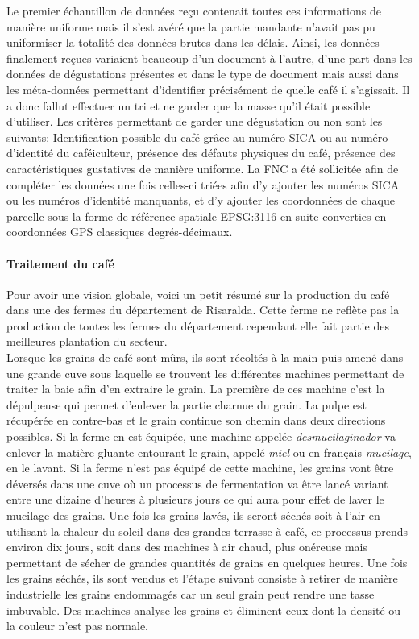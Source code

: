 \noindent Le premier échantillon de données reçu contenait toutes ces informations de manière uniforme mais il s'est avéré que la partie mandante n'avait pas pu uniformiser la totalité des données brutes dans les délais. Ainsi, les données finalement reçues variaient beaucoup d'un document à l'autre, d'une part dans les données de dégustations présentes et dans le type de document mais aussi dans les méta-données permettant d'identifier précisément de quelle café il s'agissait. Il a donc fallut effectuer un tri et ne garder que la masse qu'il était possible d'utiliser. Les critères permettant de garder une dégustation ou non sont les suivants: Identification possible du café grâce au numéro SICA ou au numéro d'identité du caféiculteur, présence des défauts physiques du café, présence des caractéristiques gustatives de manière uniforme. La FNC a été sollicitée afin de compléter les données une fois celles-ci triées afin d'y ajouter les numéros SICA ou les numéros d'identité manquants, et d'y ajouter les coordonnées de chaque parcelle sous la forme de référence spatiale EPSG:3116 en suite converties en coordonnées GPS classiques degrés-décimaux.\\

\paragraph{Traitement du café} Pour avoir une vision globale, voici un petit résumé sur la production du café dans une des fermes du département de Risaralda. Cette ferme ne reflète pas la production de toutes les fermes du département cependant elle fait partie des meilleures plantation du secteur. \\

\noindent Lorsque les grains de café sont mûrs, ils sont récoltés à la main puis amené dans une grande cuve sous laquelle se trouvent les différentes machines permettant de traiter la baie afin d'en extraire le grain. La première de ces machine c'est la dépulpeuse qui permet d'enlever la partie charnue du grain. La pulpe est récupérée en contre-bas et le grain continue son chemin dans deux directions possibles. Si la ferme en est équipée, une machine appelée \textit{desmucilaginador} va enlever la matière gluante entourant le grain, appelé \textit{miel} ou en français \textit{mucilage}, en le lavant. Si la ferme n'est pas équipé de cette machine, les grains vont être déversés dans une cuve où un processus de fermentation va être lancé variant entre une dizaine d'heures à plusieurs jours ce qui aura pour effet de laver le mucilage des grains. Une fois les grains lavés, ils seront séchés soit à l'air en utilisant la chaleur du soleil dans des grandes terrasse à café, ce processus prends environ dix jours, soit dans des machines à air chaud, plus onéreuse mais permettant de sécher de grandes quantités de grains en quelques heures. Une fois les grains séchés, ils sont vendus et l'étape suivant consiste à retirer de manière industrielle les grains endommagés car un seul grain peut rendre une tasse imbuvable. Des machines analyse les grains et éliminent ceux dont la densité ou la couleur n'est pas normale.\cite{GuideCafe} \\

